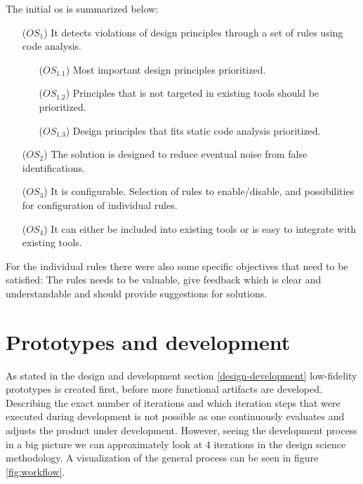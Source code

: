 \documentclass[pdftex,10pt,b5paper,twoside]{report}
\begin{document}
The initial \gls{os} is summarized below:
\begin{itemize}
    \item [(\(OS_{1}\))] It detects violations of design principles through a set of rules using code analysis.
    \begin{itemize}
        
        \item [(\(OS_{1.1}\))] Most important design principles prioritized.
        
        \item [(\(OS_{1.2}\))] Principles that is not targeted in existing tools should be prioritized.
        
        \item [(\(OS_{1.3}\))] Design principles that fits static code analysis prioritized.
    \end{itemize}
    \item [(\(OS_{2}\))] The solution is designed to reduce eventual noise from false identifications. 
    
    \item [(\(OS_{3}\))] It is configurable. Selection of rules to enable/disable, and possibilities for configuration of individual rules.  
    
    \item [(\(OS_{4}\))] It can either be included into existing tools or is easy to integrate with existing tools.
\end{itemize}

For the individual rules there were also some specific objectives that need to be satisfied: The rules needs to be valuable, give feedback which is clear and understandable and should provide suggestions for solutions.

\section{Prototypes and development}
\label{on-prototypes}
As stated in the design and development section \ref{design-development} low-fidelity prototypes is created first, before more functional artifacts are developed. Describing the exact number of iterations and which iteration steps that were executed during development is not possible as one continuously evaluates and adjusts the product under development. However, seeing the development process in a big picture we can approximately look at 4 iterations in the design science methodology. A visualization of the general process can be seen in figure \ref{fig:workflow}.
\end{document}
